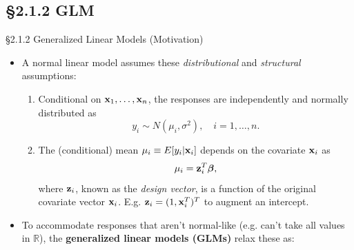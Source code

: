 \documentclass{beamer}
\newcommand{\currentsubsection}{}
\let\oldsubsection\subsection
\renewcommand{\subsection}[1]{\oldsubsection{#1}\renewcommand{\currentsubsection}{#1}}
\newcommand{\boldbeta}{{\boldsymbol \beta}}
\newcommand{\bx}{{\bf x}}
\newcommand{\bz}{{\bf z}}
\newenvironment{wideitemize}%
  {\begin{itemize}%
    \setlength{\parskip}{1em}}%
  {\end{itemize}}
\begin{document}
\subsection{\S2.1.2 GLM}
\begin{frame}{\S2.1.2 Generalized Linear Models (Motivation)}
\begin{wideitemize}
\item A normal linear model  assumes these \emph{distributional} and \emph{structural} assumptions: 
\begin{enumerate}
\item Conditional on ${\bf x}_1, \dots, {\bf x}_n$, the responses are independently and normally distributed as 
\[
y_i \sim N(\mu_i, \sigma^2), \quad i = 1, \dots, n.
\]
\item The (conditional) mean $\mu_i \equiv E[y_i | {\bf x}_i]$ depends on the covariate ${\bf x}_i$ as
\[
\mu_i  = {\bf z}^T_i \boldbeta,
\]
where $\bz_i$, known as the \emph{design vector}, is a function of the original covariate vector ${\bf x}_i$. E.g. $\bz_i = (1, \bx_i^T)^T$ to augment an intercept.
\end{enumerate}

\item To accommodate responses that aren't normal-like (e.g. can't take all values in $\mathbb{R}$), the  {\bf generalized linear models (GLMs)} relax these as:


\end{wideitemize}

\end{frame}
\end{document}

